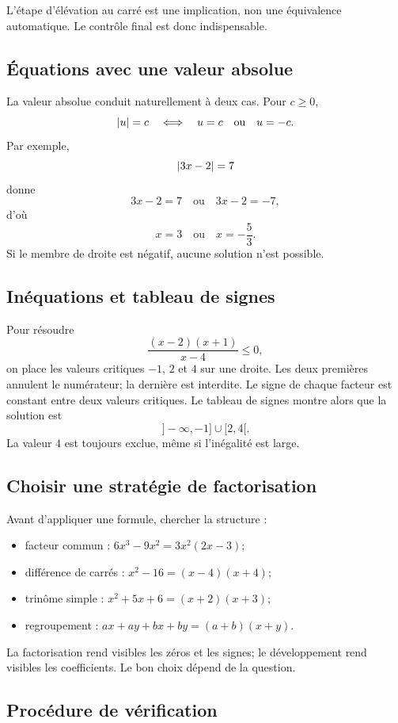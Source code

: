 L'étape d'élévation au carré est une implication, non une équivalence automatique. Le contrôle final est donc indispensable.

\subsection{Équations avec une valeur absolue}

La valeur absolue conduit naturellement à deux cas. Pour $c\geq0$,
\[
\left\lvert u\right\rvert=c
\quad\Longleftrightarrow\quad
u=c\quad\text{ou}\quad u=-c.
\]
Par exemple,
\[
\left\lvert 3x-2\right\rvert=7
\]
donne
\[
3x-2=7\quad\text{ou}\quad3x-2=-7,
\]
d'où
\[
x=3\quad\text{ou}\quad x=-\frac53.
\]
Si le membre de droite est négatif, aucune solution n'est possible.

\subsection{Inéquations et tableau de signes}

Pour résoudre
\[
\frac{(x-2)(x+1)}{x-4}\leq0,
\]
on place les valeurs critiques $-1$, $2$ et $4$ sur une droite. Les deux premières annulent le numérateur; la dernière est interdite. Le signe de chaque facteur est constant entre deux valeurs critiques. Le tableau de signes montre alors que la solution est
\[
]-\infty,-1]\cup[2,4[.
\]
La valeur $4$ est toujours exclue, même si l'inégalité est large.

\subsection{Choisir une stratégie de factorisation}

Avant d'appliquer une formule, chercher la structure :
\begin{itemize}
\item facteur commun : $6x^3-9x^2=3x^2(2x-3)$;
\item différence de carrés : $x^2-16=(x-4)(x+4)$;
\item trinôme simple : $x^2+5x+6=(x+2)(x+3)$;
\item regroupement : $ax+ay+bx+by=(a+b)(x+y)$.
\end{itemize}
La factorisation rend visibles les zéros et les signes; le développement rend visibles les coefficients. Le bon choix dépend de la question.

\subsection{Procédure de vérification}

